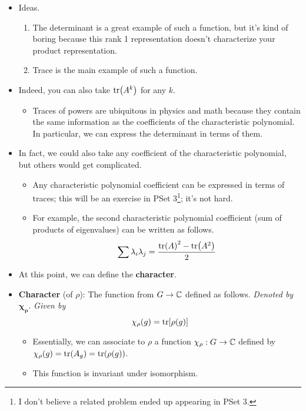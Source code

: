 \documentclass[../notes.tex]{subfiles}
\begin{document}
\begin{itemize}
    \item Ideas.
    \begin{enumerate}
        \item The determinant is a great example of such a function, but it's kind of boring because this rank 1 representation doesn't characterize your product representation.
        \item Trace is the main example of such a function.
    \end{enumerate}
    \item Indeed, you can also take $\tr(A^k)$ for any $k$.
    \begin{itemize}
        \item Traces of powers are ubiquitous in physics and math because they contain the same information as the coefficients of the characteristic polynomial. In particular, we can express the determinant in terms of them.
    \end{itemize}
    \item In fact, we could also take any coefficient of the characteristic polynomial, but others would get complicated.
    \begin{itemize}
        \item Any characteristic polynomial coefficient can be expressed in terms of traces; this will be an exercise in PSet 3\footnote{I don't believe a related problem ended up appearing in PSet 3.}; it's not hard.
        \item For example, the second characteristic polynomial coefficient (sum of products of eigenvalues) can be written as follows.
        \begin{equation*}
            \sum\lambda_i\lambda_j = \frac{\tr(A)^2-\tr(A^2)}{2}
        \end{equation*}
    \end{itemize}
    \item At this point, we can define the \textbf{character}.
    \item \textbf{Character} (of $\rho$): The function from $G\to\mathbb{C}$ defined as follows. \emph{Denoted by} $\bm{\chi_\rho}$. \emph{Given by}
    \begin{equation*}
        \chi_\rho(g) = \tr[\rho(g)]
    \end{equation*}
    \begin{itemize}
        \item Essentially, we can associate to $\rho$ a function $\chi_\rho:G\to\mathbb{C}$ defined by $\chi_\rho(g)=\tr(A_g)=\tr(\rho(g))$.
        \item This function is invariant under isomorphism.

\end{itemize}
\end{itemize}
\end{document}
